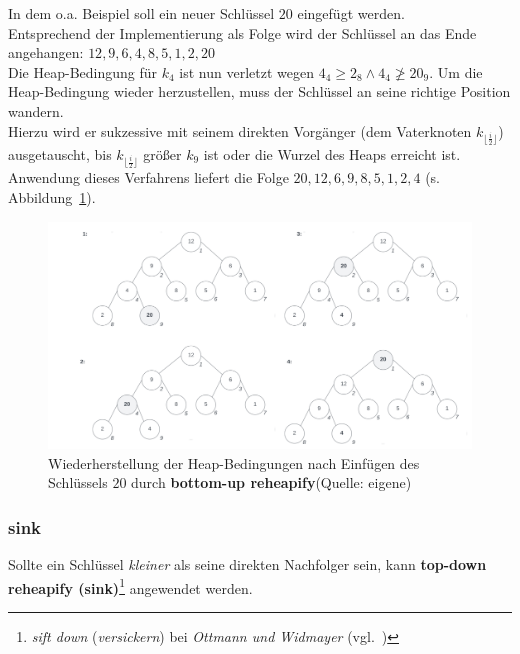\noindent
In dem o.a. Beispiel soll ein neuer Schlüssel $20$ eingefügt werden.\\
Entsprechend der Implementierung als Folge wird der Schlüssel an das Ende angehangen: $12, 9, 6, 4, 8, 5, 1, 2, 20$\\

\noindent
Die Heap-Bedingung für $k_4$ ist nun verletzt wegen $4_4 \geq 2_8 \land 4_4 \ngeq 20_9$.
Um die Heap-Bedingung wieder herzustellen, muss der Schlüssel an seine richtige Position wandern.\\
Hierzu wird er sukzessive mit seinem direkten Vorgänger (dem Vaterknoten $k_{\lfloor \frac{i}{2} \rfloor}$) ausgetauscht, bis $k_{\lfloor \frac{i}{2} \rfloor}$ größer $k_9$ ist oder die Wurzel des Heaps erreicht ist.\\
Anwendung dieses Verfahrens liefert die Folge $20, 12, 6, 9, 8, 5, 1, 2, 4$  (s. Abbildung~\ref{fig:swim}).

\begin{figure}
    \begin{center}
        \includegraphics[scale=0.25]{chapters/Datenstrukturen und Algorithmen/img/swim}
        \caption{Wiederherstellung der Heap-Bedingungen nach Einfügen des Schlüssels $20$ durch \textbf{bottom-up reheapify}(Quelle: eigene)}
        \label{fig:swim}
    \end{center}
\end{figure}

\subsubsection{sink}
Sollte ein Schlüssel \textit{kleiner} als seine direkten Nachfolger sein, kann \textbf{top-down reheapify (sink)}\footnote{\textit{sift down} (\textit{versickern}) bei \textit{Ottmann und Widmayer} (vgl.~\cite[107 f.]{OW17b})} angewendet werden.\\


